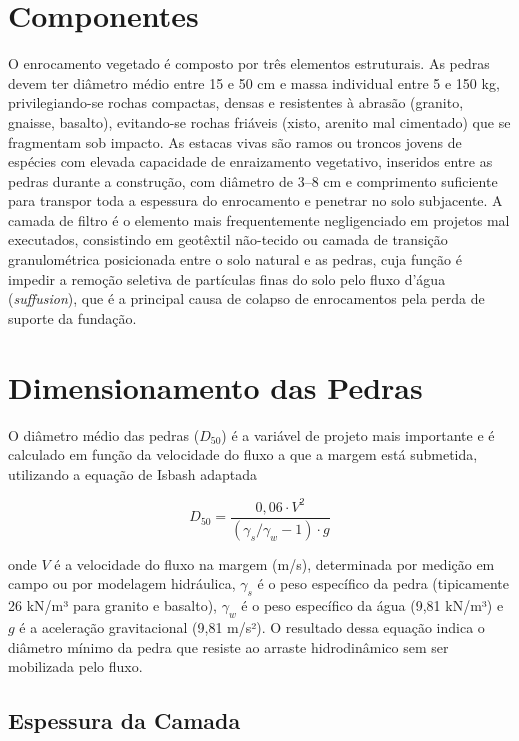 \documentclass[
  portuguese,
  11pt,
  a4paper,
  open=any]{scrbook}
\begin{document}
\section{Componentes}\label{componentes}

O enrocamento vegetado é composto por três elementos estruturais. As
pedras devem ter diâmetro médio entre 15 e 50 cm e massa individual
entre 5 e 150 kg, privilegiando-se rochas compactas, densas e
resistentes à abrasão (granito, gnaisse, basalto), evitando-se rochas
friáveis (xisto, arenito mal cimentado) que se fragmentam sob impacto.
As estacas vivas são ramos ou troncos jovens de espécies com elevada
capacidade de enraizamento vegetativo, inseridos entre as pedras durante
a construção, com diâmetro de 3--8 cm e comprimento suficiente para
transpor toda a espessura do enrocamento e penetrar no solo subjacente.
A camada de filtro é o elemento mais frequentemente negligenciado em
projetos mal executados, consistindo em geotêxtil não-tecido ou camada
de transição granulométrica posicionada entre o solo natural e as
pedras, cuja função é impedir a remoção seletiva de partículas finas do
solo pelo fluxo d'água (\emph{suffusion}), que é a principal causa de
colapso de enrocamentos pela perda de suporte da fundação.

\section{Dimensionamento das Pedras}\label{dimensionamento-das-pedras}

O diâmetro médio das pedras (\(D_{50}\)) é a variável de projeto mais
importante e é calculado em função da velocidade do fluxo a que a margem
está submetida, utilizando a equação de Isbash adaptada

\[
D_{50} = \frac{0{,}06 \cdot V^2}{(\gamma_s / \gamma_w - 1) \cdot g}
\]

onde \(V\) é a velocidade do fluxo na margem (m/s), determinada por
medição em campo ou por modelagem hidráulica, \(\gamma_s\) é o peso
específico da pedra (tipicamente 26 kN/m³ para granito e basalto),
\(\gamma_w\) é o peso específico da água (9,81 kN/m³) e \(g\) é a
aceleração gravitacional (9,81 m/s²). O resultado dessa equação indica o
diâmetro mínimo da pedra que resiste ao arraste hidrodinâmico sem ser
mobilizada pelo fluxo.

\subsection{Espessura da Camada}\label{espessura-da-camada}
\end{document}
